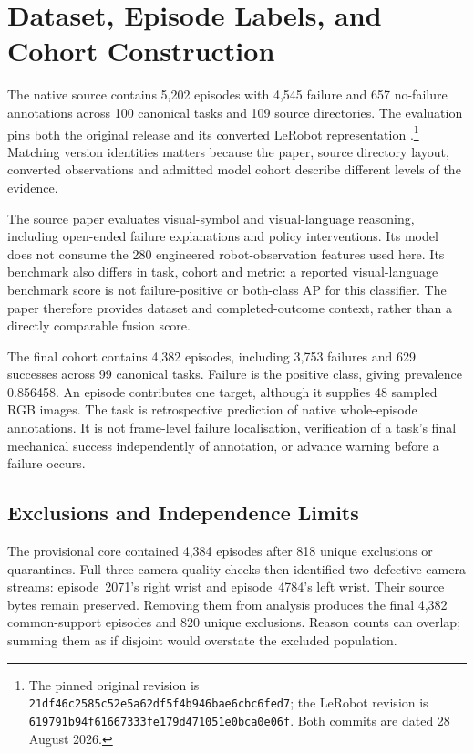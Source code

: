 \section{Dataset, Episode Labels, and Cohort Construction}
The native source contains 5,202 episodes with 4,545 failure and 657 no-failure
annotations across 100 canonical tasks and 109 source directories. The evaluation pins
both the original release and its converted LeRobot representation
\parencite{ViFailbackHF2025,ViFailbackLeRobotHF}.\footnote{The pinned original revision
is \nolinkurl{21df46c2585c52e5a62df5f4b946bae6cbc6fed7}; the LeRobot revision is
\nolinkurl{619791b94f61667333fe179d471051e0bca0e06f}. Both commits are dated
28 August 2026.}
Matching version identities matters because the paper, source
directory layout, converted observations and admitted model cohort describe different
levels of the evidence.

The source paper evaluates visual-symbol and visual-language reasoning, including
open-ended failure explanations and policy interventions. Its model does not consume the
280 engineered robot-observation features used here. Its benchmark also differs in task,
cohort and metric: a reported visual-language benchmark score is not failure-positive or
both-class AP for this classifier. The paper therefore provides dataset and
completed-outcome context, rather than a directly comparable fusion score.

The final cohort contains 4,382 episodes, including 3,753 failures and 629 successes
across 99 canonical tasks. Failure is the positive class, giving prevalence 0.856458. An
episode contributes one target, although it supplies 48 sampled RGB images. The task is
retrospective prediction of native whole-episode annotations. It is not frame-level
failure localisation, verification of a task's final mechanical success independently of
annotation, or advance warning before a failure occurs.

\subsection{Exclusions and Independence Limits}
The provisional core contained 4,384 episodes after 818 unique exclusions or
quarantines. Full three-camera quality checks then identified two defective camera
streams: episode~2071's right wrist and episode~4784's left wrist. Their source bytes
remain preserved. Removing them from analysis produces the final 4,382 common-support
episodes and 820 unique exclusions. Reason counts can overlap; summing them as if
disjoint would overstate the excluded population.

